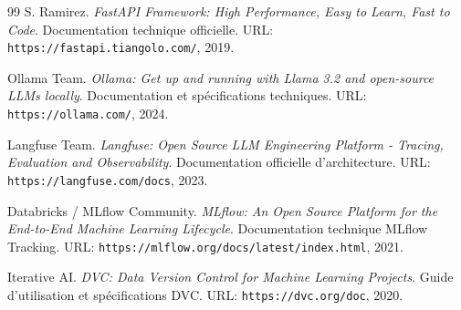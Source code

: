 \begin{thebibliography}{99}
S. Ramirez.
\newblock \textit{FastAPI Framework: High Performance, Easy to Learn, Fast to Code}.
\newblock Documentation technique officielle. URL: \texttt{https://fastapi.tiangolo.com/}, 2019.

Ollama Team.
\newblock \textit{Ollama: Get up and running with Llama 3.2 and open-source LLMs locally}.
\newblock Documentation et spécifications techniques. URL: \texttt{https://ollama.com/}, 2024.

Langfuse Team.
\newblock \textit{Langfuse: Open Source LLM Engineering Platform - Tracing, Evaluation and Observability}.
\newblock Documentation officielle d'architecture. URL: \texttt{https://langfuse.com/docs}, 2023.

Databricks / MLflow Community.
\newblock \textit{MLflow: An Open Source Platform for the End-to-End Machine Learning Lifecycle}.
\newblock Documentation technique MLflow Tracking. URL: \texttt{https://mlflow.org/docs/latest/index.html}, 2021.

Iterative AI.
\newblock \textit{DVC: Data Version Control for Machine Learning Projects}.
\newblock Guide d'utilisation et spécifications DVC. URL: \texttt{https://dvc.org/doc}, 2020.

\end{thebibliography}
